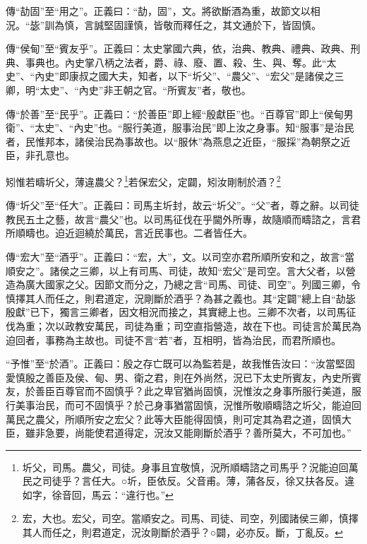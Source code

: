 {\noindent\zhuan{}\fzbyks 傳“劼固”至“用之”。正義曰：“劼，固”，文。將欲斷酒為重，故節文以相況。“毖”訓為慎，言誠堅固謹慎，皆敬而釋任之，其文通於下，皆固慎。 \par}

{\noindent\zhuan{}\fzbyks 傳“侯甸”至“賓友乎”。正義曰：太史掌國六典，依，治典、教典、禮典、政典、刑典、事典也。內史掌八柄之法者，爵、祿、廢、置、殺、生、與、奪。此“太史”、“內史”即康叔之國大夫，知者，以下“圻父”、“農父”、“宏父”是諸侯之三卿，明“太史”、“內史”非王朝之官。“所賓友”者，敬也。 \par}

{\noindent\zhuan{}\fzbyks 傳“於善”至“民乎”。正義曰：“於善臣”即上經“殷獻臣”也。“百尊官”即上“侯甸男衛”、“太史”、“內史”也。“服行美道，服事治民”即上汝之身事。知“服事”是治民者，民惟邦本，諸侯治民為事故也。以“服休”為燕息之近臣，“服採”為朝祭之近臣，非孔意也。 \par}

矧惟若疇圻父，薄違農父？\footnote{圻父，司馬。農父，司徒。身事且宜敬慎，況所順疇諮之司馬乎？況能迫回萬民之司徒乎？言任大。○圻，臣依反。父音甫。薄，蒲各反，徐又扶各反。違如字，徐音回，馬云：“違行也。”}若保宏父，定闢，矧汝剛制於酒？\footnote{宏，大也。宏父，司空。當順安之。司馬、司徒、司空，列國諸侯三卿，慎擇其人而任之，則君道定，況汝剛斷於酒乎？○闢，必亦反。斷，丁亂反。}

{\noindent\zhuan{}\fzbyks 傳“圻父”至“任大”。正義曰：司馬主圻封，故云“圻父”。“父”者，尊之辭。以司徒教民五土之藝，故言“農父”也。以司馬征伐在乎閫外所專，故隨順而疇諮之，言君所順疇也。迫近迴繞於萬民，言近民事也。二者皆任大。 \par}

{\noindent\zhuan{}\fzbyks 傳“宏大”至“酒乎”。正義曰：“宏，大”，文。以司空亦君所順所安和之，故言“當順安之”。諸侯之三卿，以上有司馬、司徒，故知“宏父”是司空。言大父者，以營造為廣大國家之父。因節文而分之，乃總之言“司馬、司徒、司空”。列國三卿，令慎擇其人而任之，則君道定，況剛斷於酒乎？為甚之義也。其“定闢”總上自“劼毖殷獻”已下，獨言三卿者，因文相況而接之，其實總上也。三卿不次者，以司馬征伐為重；次以政教安萬民，司徒為重；司空直指營造，故在下也。司徒言於萬民為迫回者，事務為主故也。司徒不言“若”者，互相明，皆為治民，而君所順也。 \par}

{\noindent\shu{}\fzkt “予惟”至“於酒”。正義曰：殷之存亡既可以為監若是，故我惟告汝曰：“汝當堅固愛慎殷之善臣及侯、甸、男、衛之君，則在外尚然，況已下太史所賓友，內史所賓友，於善臣百尊官而不固慎乎？此之卑官猶尚固慎，況惟汝之身事所服行美道，服行美事治民，而可不固慎乎？於己身事猶當固慎，況惟所敬順疇諮之圻父，能迫回萬民之農父，所順所安之宏父？此等大臣能得固慎，則可定其為君之道，固慎大臣，雖非急要，尚能使君道得定，況汝又能剛斷於酒乎？善所莫大，不可加也。” \par}

